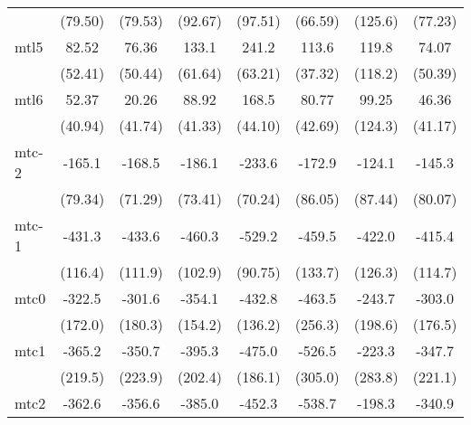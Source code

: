 \documentclass{article}
\begin{document}
{\begin{longtable}{l*{7}{c}}
                &  (79.50)         &  (79.53)         &  (92.67)         &  (97.51)         &  (66.59)         &  (125.6)         &  (77.23)         \\
mtl5            &    82.52         &    76.36         &    133.1         &    241.2\sym{*}  &    113.6\sym{*}  &    119.8         &    74.07         \\
                &  (52.41)         &  (50.44)         &  (61.64)         &  (63.21)         &  (37.32)         &  (118.2)         &  (50.39)         \\
mtl6            &    52.37         &    20.26         &    88.92         &    168.5\sym{*}  &    80.77         &    99.25         &    46.36         \\
                &  (40.94)         &  (41.74)         &  (41.33)         &  (44.10)         &  (42.69)         &  (124.3)         &  (41.17)         \\
mtc-2           &   -165.1         &   -168.5         &   -186.1         &   -233.6\sym{*}  &   -172.9         &   -124.1         &   -145.3         \\
                &  (79.34)         &  (71.29)         &  (73.41)         &  (70.24)         &  (86.05)         &  (87.44)         &  (80.07)         \\
mtc-1           &   -431.3\sym{*}  &   -433.6\sym{*}  &   -460.3\sym{**} &   -529.2\sym{**} &   -459.5\sym{*}  &   -422.0\sym{*}  &   -415.4\sym{*}  \\
                &  (116.4)         &  (111.9)         &  (102.9)         &  (90.75)         &  (133.7)         &  (126.3)         &  (114.7)         \\
mtc0            &   -322.5         &   -301.6         &   -354.1         &   -432.8\sym{*}  &   -463.5         &   -243.7         &   -303.0         \\
                &  (172.0)         &  (180.3)         &  (154.2)         &  (136.2)         &  (256.3)         &  (198.6)         &  (176.5)         \\
mtc1            &   -365.2         &   -350.7         &   -395.3         &   -475.0         &   -526.5         &   -223.3         &   -347.7         \\
                &  (219.5)         &  (223.9)         &  (202.4)         &  (186.1)         &  (305.0)         &  (283.8)         &  (221.1)         \\
mtc2            &   -362.6         &   -356.6         &   -385.0         &   -452.3         &   -538.7         &   -198.3         &   -340.9         \\

\end{longtable}}
\end{document}
